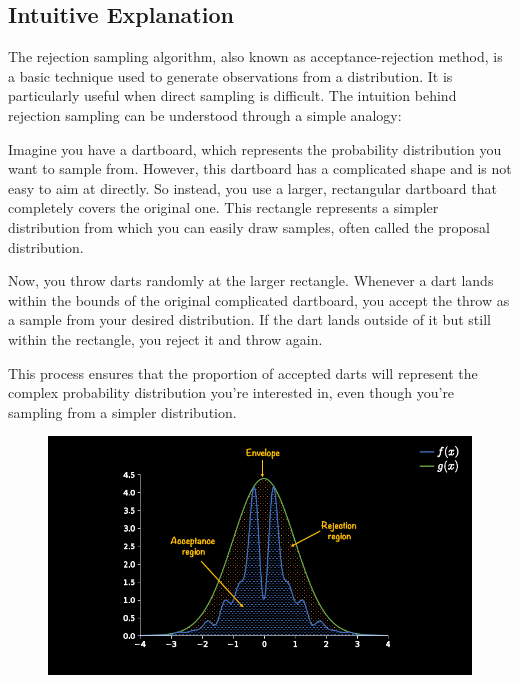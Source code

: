 \documentclass{article}
\begin{document}
\subsection{Intuitive Explanation}
The rejection sampling algorithm, also known as acceptance-rejection method, is a basic technique used to generate observations from a distribution. It is particularly useful when direct sampling is difficult. The intuition behind rejection sampling can be understood through a simple analogy:

Imagine you have a dartboard, which represents the probability distribution you want to sample from. However, this dartboard has a complicated shape and is not easy to aim at directly. So instead, you use a larger, rectangular dartboard that completely covers the original one. This rectangle represents a simpler distribution from which you can easily draw samples, often called the proposal distribution.

Now, you throw darts randomly at the larger rectangle. Whenever a dart lands within the bounds of the original complicated dartboard, you accept the throw as a sample from your desired distribution. If the dart lands outside of it but still within the rectangle, you reject it and throw again.

This process ensures that the proportion of accepted darts will represent the complex probability distribution you're interested in, even though you're sampling from a simpler distribution.

\begin{figure}
    \centering
    \includegraphics[width=1\linewidth]{ox-hilary/simulation-methods/figures/1_Y8v8ASUKQxeWDHSDTJb7aA.png}
\end{figure}
\end{document}
